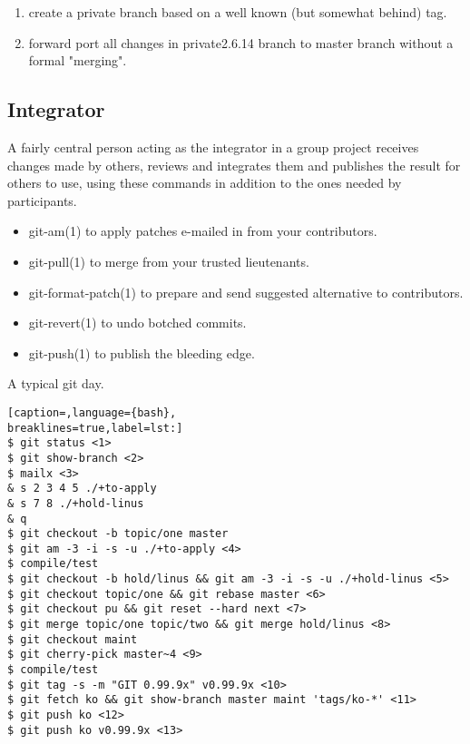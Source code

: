 \begin{enumerate}
\setlength{\itemsep}{0cm}
\setlength{\parskip}{0cm}
\item create a private branch based on a well known (but somewhat behind) tag.
\item forward port all changes in private2.6.14 branch to master branch without a formal "merging".
\end{enumerate}

\subsection{Integrator}
A fairly central person acting as the integrator in a group project receives
changes made by others, reviews and integrates them and publishes the result
for others to use, using these commands in addition to the ones needed by
participants.
\begin{itemize}
\setlength{\itemsep}{0cm}
\setlength{\parskip}{0cm}
\item git-am(1) to apply patches e-mailed in from your contributors.
\item git-pull(1) to merge from your trusted lieutenants.
\item git-format-patch(1) to prepare and send suggested alternative to contributors.
\item git-revert(1) to undo botched commits.
\item git-push(1) to publish the bleeding edge.
\end{itemize}

A typical git day.
\lstset{basicstyle=\scriptsize, numbers=none, captionpos=b, tabsize=4}
\begin{lstlisting}[caption=,language={bash},
breaklines=true,label=lst:]
$ git status <1>
$ git show-branch <2>
$ mailx <3>
& s 2 3 4 5 ./+to-apply
& s 7 8 ./+hold-linus
& q
$ git checkout -b topic/one master
$ git am -3 -i -s -u ./+to-apply <4>
$ compile/test
$ git checkout -b hold/linus && git am -3 -i -s -u ./+hold-linus <5>
$ git checkout topic/one && git rebase master <6>
$ git checkout pu && git reset --hard next <7>
$ git merge topic/one topic/two && git merge hold/linus <8>
$ git checkout maint
$ git cherry-pick master~4 <9>
$ compile/test
$ git tag -s -m "GIT 0.99.9x" v0.99.9x <10>
$ git fetch ko && git show-branch master maint 'tags/ko-*' <11>
$ git push ko <12>
$ git push ko v0.99.9x <13>
\end{lstlisting}

